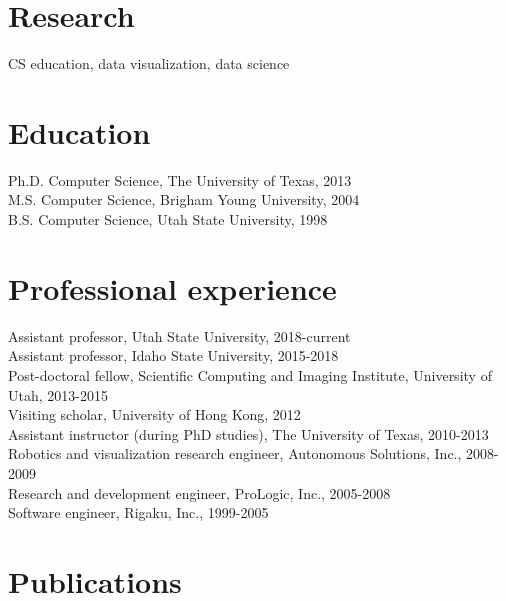 \documentclass[margin,line]{res}
\begin{document}
\begin{resume}
\section{\sc Research}

CS education, data visualization, data science

\section{\sc Education}

Ph.D. Computer Science, The University of Texas, 2013\\
M.S. Computer Science, Brigham Young University, 2004\\
B.S. Computer Science, Utah State University, 1998\\

\section{\sc Professional experience}

Assistant professor, Utah State University, 2018-current\\
Assistant professor, Idaho State University, 2015-2018\\
Post-doctoral fellow, Scientific Computing and Imaging
Institute, University of Utah, 2013-2015\\
Visiting scholar, University of Hong Kong, 2012\\
Assistant instructor (during PhD studies), The University of Texas, 2010-2013\\
Robotics and visualization research engineer, Autonomous Solutions, Inc., 2008-2009\\
Research and development engineer, ProLogic, Inc., 2005-2008 \\
Software engineer, Rigaku, Inc., 1999-2005 \\

\section{\sc Publications}


\end{resume}
\end{document}
